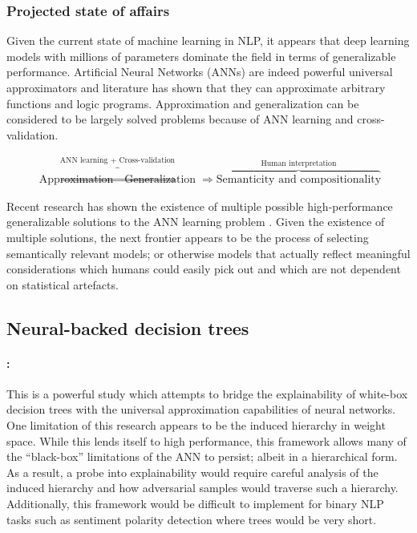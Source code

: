 \subsubsection{Projected state of affairs}

Given the current state of machine learning in NLP, it appears that deep learning models with millions of parameters dominate the field in terms of generalizable performance. Artificial Neural Networks (ANNs) are indeed powerful universal approximators and literature has shown that they can approximate arbitrary functions and logic programs. Approximation and generalization can be considered to be largely solved problems because of ANN learning and cross-validation.

\begin{gather}
  \overbrace{\text{Approximation} \Rightarrow \text{Generalization}}^{\text{ANN learning + Cross-validation}} \Rightarrow \overbrace{\text{Semanticity and compositionality}}^{\text{Human interpretation}}
\end{gather}

Recent research has shown the existence of multiple possible high-performance generalizable solutions to the ANN learning problem \citep{kepner2018sparse}. Given the existence of multiple solutions, the next frontier appears to be the process of selecting semantically relevant models; or otherwise models that actually reflect meaningful considerations which humans could easily pick out and which are not dependent on statistical artefacts.

\subsection{Neural-backed decision trees}

\paragraph{\citealt{wan2020nbdt}:} This is a powerful study which attempts to bridge the explainability of white-box decision trees with the universal approximation capabilities of neural networks. One limitation of this research appears to be the induced hierarchy in weight space. While this lends itself to high performance, this framework allows many of the ``black-box'' limitations of the ANN to persist; albeit in a hierarchical form. As a result, a probe into explainability would require careful analysis of the induced hierarchy and how adversarial samples would traverse such a hierarchy. Additionally, this framework would be difficult to implement for binary NLP tasks such as sentiment polarity detection where trees would be very short.

